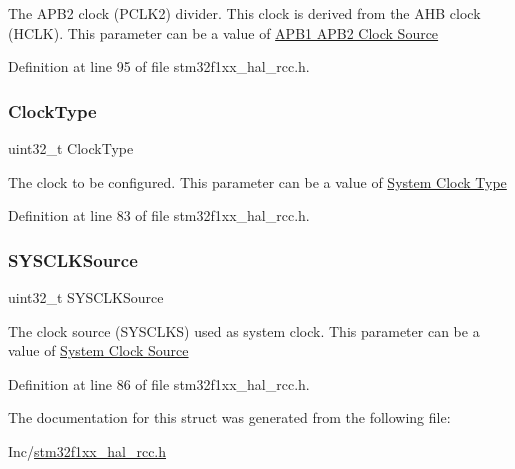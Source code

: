 The A\+P\+B2 clock (P\+C\+L\+K2) divider. This clock is derived from the A\+HB clock (H\+C\+LK). This parameter can be a value of \hyperlink{group___r_c_c___a_p_b1___a_p_b2___clock___source}{A\+P\+B1 A\+P\+B2 Clock Source} 

Definition at line 95 of file stm32f1xx\+\_\+hal\+\_\+rcc.\+h.

\mbox{\label{struct_r_c_c___clk_init_type_def_afe92b105bff8e698233c286bb3018384}} 
\subsubsection{\texorpdfstring{Clock\+Type}{ClockType}}
{\footnotesize\ttfamily uint32\+\_\+t Clock\+Type}

The clock to be configured. This parameter can be a value of \hyperlink{group___r_c_c___system___clock___type}{System Clock Type} 

Definition at line 83 of file stm32f1xx\+\_\+hal\+\_\+rcc.\+h.

\mbox{\label{struct_r_c_c___clk_init_type_def_a02b70c23b593a55814d887f483ea0871}} 
\subsubsection{\texorpdfstring{S\+Y\+S\+C\+L\+K\+Source}{SYSCLKSource}}
{\footnotesize\ttfamily uint32\+\_\+t S\+Y\+S\+C\+L\+K\+Source}

The clock source (S\+Y\+S\+C\+L\+KS) used as system clock. This parameter can be a value of \hyperlink{group___r_c_c___system___clock___source}{System Clock Source} 

Definition at line 86 of file stm32f1xx\+\_\+hal\+\_\+rcc.\+h.



The documentation for this struct was generated from the following file\+:\begin{DoxyCompactItemize}
\item 
Inc/\hyperlink{stm32f1xx__hal__rcc_8h}{stm32f1xx\+\_\+hal\+\_\+rcc.\+h}\end{DoxyCompactItemize}
